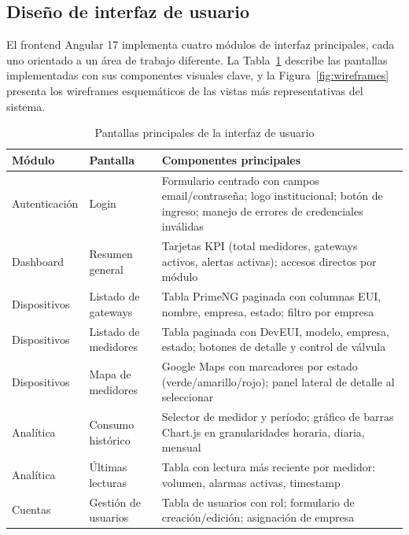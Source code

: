 \documentclass[12pt,a4paper,oneside]{report}
\begin{document}
\subsection{Diseño de interfaz de usuario}\label{subsec:ui}

El frontend Angular 17 implementa cuatro módulos de interfaz principales, cada uno orientado a un área de trabajo diferente. La Tabla~\ref{tab:pantallas} describe las pantallas implementadas con sus componentes visuales clave, y la Figura~\ref{fig:wireframes} presenta los wireframes esquemáticos de las vistas más representativas del sistema.

\begin{table}[H]
\caption{Pantallas principales de la interfaz de usuario}\label{tab:pantallas}
\centering
\begin{tabularx}{\textwidth}{llX}
\toprule
\textbf{Módulo} & \textbf{Pantalla} & \textbf{Componentes principales} \\
\midrule
Autenticación & Login & Formulario centrado con campos email/contraseña; logo institucional; botón de ingreso; manejo de errores de credenciales inválidas \\
Dashboard & Resumen general & Tarjetas KPI (total medidores, gateways activos, alertas activas); accesos directos por módulo \\
Dispositivos & Listado de gateways & Tabla PrimeNG paginada con columnas EUI, nombre, empresa, estado; filtro por empresa \\
Dispositivos & Listado de medidores & Tabla paginada con DevEUI, modelo, empresa, estado; botones de detalle y control de válvula \\
Dispositivos & Mapa de medidores & Google Maps con marcadores por estado (verde/amarillo/rojo); panel lateral de detalle al seleccionar \\
Analítica & Consumo histórico & Selector de medidor y período; gráfico de barras Chart.js en granularidades horaria, diaria, mensual \\
Analítica & Últimas lecturas & Tabla con lectura más reciente por medidor: volumen, alarmas activas, timestamp \\
Cuentas & Gestión de usuarios & Tabla de usuarios con rol; formulario de creación/edición; asignación de empresa \\
\bottomrule
\end{tabularx}
\end{table}
\end{document}
